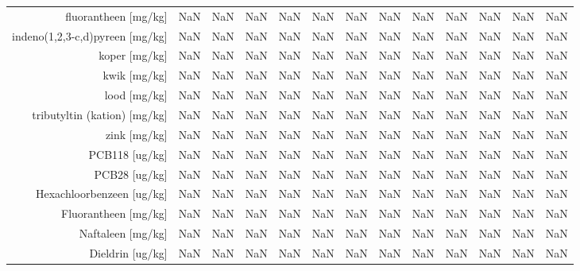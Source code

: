 \begin{tabular}{ r |c | c | c | c | c |c | c | c | c | c | c | c }
fluorantheen [mg/kg] &NaN & NaN & NaN & NaN & NaN & NaN & NaN & NaN & NaN & NaN & NaN & NaN \\
indeno(1,2,3-c,d)pyreen [mg/kg] &NaN & NaN & NaN & NaN & NaN & NaN & NaN & NaN & NaN & NaN & NaN & NaN \\
koper [mg/kg] &NaN & NaN & NaN & NaN & NaN & NaN & NaN & NaN & NaN & NaN & NaN & NaN \\
kwik [mg/kg] &NaN & NaN & NaN & NaN & NaN & NaN & NaN & NaN & NaN & NaN & NaN & NaN \\
lood [mg/kg] &NaN & NaN & NaN & NaN & NaN & NaN & NaN & NaN & NaN & NaN & NaN & NaN \\
tributyltin (kation) [mg/kg] &NaN & NaN & NaN & NaN & NaN & NaN & NaN & NaN & NaN & NaN & NaN & NaN \\
zink [mg/kg] &NaN & NaN & NaN & NaN & NaN & NaN & NaN & NaN & NaN & NaN & NaN & NaN \\
PCB118 [ug/kg] &NaN & NaN & NaN & NaN & NaN & NaN & NaN & NaN & NaN & NaN & NaN & NaN \\
PCB28 [ug/kg] &NaN & NaN & NaN & NaN & NaN & NaN & NaN & NaN & NaN & NaN & NaN & NaN \\
Hexachloorbenzeen [ug/kg] &NaN & NaN & NaN & NaN & NaN & NaN & NaN & NaN & NaN & NaN & NaN & NaN \\
Fluorantheen [mg/kg] &NaN & NaN & NaN & NaN & NaN & NaN & NaN & NaN & NaN & NaN & NaN & NaN \\
Naftaleen [mg/kg] &NaN & NaN & NaN & NaN & NaN & NaN & NaN & NaN & NaN & NaN & NaN & NaN \\
Dieldrin [ug/kg] &NaN & NaN & NaN & NaN & NaN & NaN & NaN & NaN & NaN & NaN & NaN & NaN \\
\end{tabular}    
